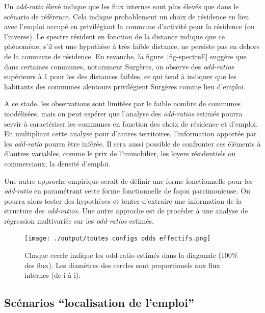 \documentclass[
  10pt,
  a4paper,
  numbers=noendperiod,
  DIV=9]{scrreprt}
\begin{document}
Un \emph{odd-ratio} élevé indique que les flux internes sont plus élevés
que dans le scénario de référence. Cela indique probablement un choix de
résidence en lien avec l'emploi occupé en privilégiant la commune
d'activité pour la résidence (ou l'inverse). Le spectre résident en
fonction de la distance indique que ce phénomène, s'il est une hypothèse
à très faible distance, ne persiste pas en dehors de la commune de
résidence. En revanche, la figure~\ref{fig-spectreE} suggère que dans
certaines communes, notamment Surgères, on observe des \emph{odd-ratios}
supérieurs à 1 pour les des distances faibles, ce qui tend à indiquer
que les habitants des communes alentours privilégient Surgères comme
lieu d'emploi.

A ce stade, les observations sont limitées par le faible nombre de
communes modélisées, mais on peut espérer que l'analyse des
\emph{odd-ratios} estimés pourra servir à caractériser les communes en
fonction des choix de résidence et d'emploi. En multipliant cette
analyse pour d'autres territoires, l'information apportée par les
\emph{odd-ratio} pourra être inférée. Il sera aussi possible de
confronter ces éléments à d'autres variables, comme le prix de
l'immobilier, les loyers résidentiels ou commerciaux, la densité
d'emploi.

Une autre approche empirique serait de définir une forme fonctionnelle
pour les \emph{odd-ratio} en paramétrant cette forme fonctionnelle de
façon parcimonieuse. On pourra alors tester des hypothèses et tenter
d'extraire une information de la structure des \emph{odd-ratios.} Une
autre approche est de procéder à une analyse de régression multivariée
sur les \emph{odd-ratios} estimés.\\

\begin{figure}[htb]

{\centering \texttt{[image: ./output/toutes configs odds effectifs.png]}

}

\caption[Odd-ratio dans la diagonale]{\label{fig-carteodd}Chaque cercle
indique les odd-ratio estimés dans la diagonale (100\% des flux). Les
diamètres des cercles sont proportionels aux flux internes (de i à i).}

\end{figure}

\hypertarget{scuxe9narios-localisation-de-lemploi}{%
\subsection{Scénarios ``localisation de
l'emploi''}\label{scuxe9narios-localisation-de-lemploi}}
\end{document}
